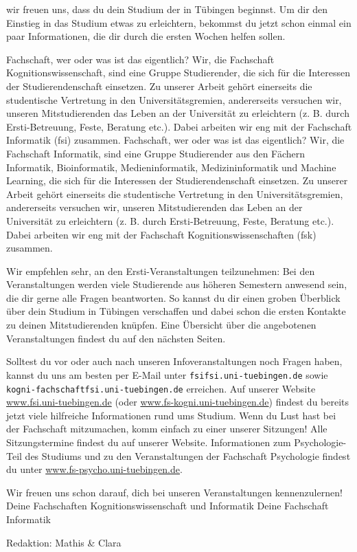 \thispagestyle{firststyle}
wir freuen uns, dass du dein Studium der \studiengang in Tübingen beginnst.
Um dir den Einstieg in das Studium etwas zu erleichtern, bekommst du jetzt schon einmal
ein paar Informationen, die dir durch die ersten Wochen helfen sollen.

\ifkogwiss
\glqq Fachschaft\grqq, wer oder was ist das eigentlich? Wir, die Fachschaft Kognitionswissenschaft,
sind eine Gruppe Studierender, die sich für die Interessen der Studierendenschaft einsetzen. Zu unserer Arbeit
gehört einerseits die studentische Vertretung in den Universitätsgremien, andererseits versuchen wir, unseren
Mitstudierenden das Leben an der Universität zu erleichtern (z. B. durch Ersti-Betreuung, Feste, Beratung etc.).
Dabei arbeiten wir eng mit der Fachschaft Informatik (fsi) zusammen.
\else
\glqq Fachschaft\grqq, wer oder was ist das eigentlich? Wir, die Fachschaft Informatik, sind eine Gruppe Studierender aus den Fächern
Informatik, Bioinformatik, Medieninformatik, Medizininformatik und Machine Learning, die sich für die Interessen der Studierendenschaft einsetzen. Zu unserer Arbeit
gehört einerseits die studentische Vertretung in den Universitätsgremien, andererseits versuchen wir, unseren
Mitstudierenden das Leben an der Universität zu erleichtern (z. B. durch Ersti-Betreuung, Feste, Beratung etc.).
Dabei arbeiten wir eng mit der Fachschaft Kognitionswissenschaften (fsk) zusammen.
\fi

Wir empfehlen sehr, an den Ersti-Veranstaltungen teilzunehmen:
Bei den Veranstaltungen werden viele Studierende aus höheren Semestern anwesend sein, die dir gerne alle Fragen beantworten.
So kannst du dir einen groben Überblick über dein Studium in Tübingen verschaffen und dabei schon die ersten Kontakte zu deinen Mitstudierenden knüpfen.
Eine Übersicht über die angebotenen Veranstaltungen findest du auf den nächsten Seiten.

Solltest du vor oder auch nach unseren Infoveranstaltungen noch Fragen haben, kannst du uns
am besten per E-Mail unter \texttt{fsi\At fsi.uni-tuebingen.de}
\ifkogwiss
sowie \texttt{kogni-fachschaft\At fsi.uni-tuebingen.de}
\fi
erreichen.
Auf unserer Website \url{www.fsi.uni-tuebingen.de} (oder \url{www.fs-kogni.uni-tuebingen.de}) findest du bereits
jetzt viele hilfreiche Informationen rund ums Studium. Wenn du Lust hast bei der Fachschaft mitzumachen,
komm einfach zu einer unserer Sitzungen! Alle Sitzungstermine findest du auf unserer Website.
\ifkogwiss  Informationen zum Psychologie-Teil des Studiums und zu den Veranstaltungen der
Fachschaft Psychologie findest du unter \url{www.fs-psycho.uni-tuebingen.de}.\fi

\enlargethispage{3\baselineskip} %
Wir freuen uns schon darauf, dich bei unseren Veranstaltungen kennenzulernen!\\
\ifkogwiss
Deine Fachschaften Kognitionswissenschaft und Informatik
\else
Deine Fachschaft Informatik
\par\hfill
{\footnotesize Redaktion: Mathis \& Clara}
\fi
\vfill
